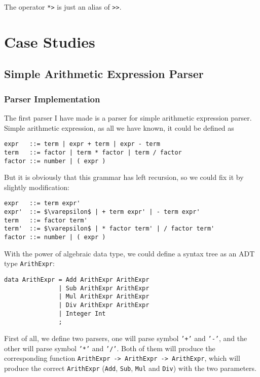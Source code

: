The operator \texttt{*>} is just an alias of \texttt{>>}.

\section{Case Studies}
\subsection{Simple Arithmetic Expression Parser}

\subsubsection{Parser Implementation}

The first parser I have made is a parser for simple arithmetic expression parser. Simple arithmetic expression, as all we have known, it could be defined as

\begin{lstlisting}[language={}]
expr   ::= term | expr + term | expr - term
term   ::= factor | term * factor | term / factor
factor ::= number | ( expr )
\end{lstlisting}

But it is obviously that this grammar has left recursion, so we could fix it by slightly modification:

\begin{lstlisting}[language={},mathescape]
expr   ::= term expr'
expr'  ::= $\varepsilon$ | + term expr' | - term expr'
term   ::= factor term'
term'  ::= $\varepsilon$ | * factor term' | / factor term'
factor ::= number | ( expr )
\end{lstlisting}

With the power of algebraic data type, we could define a syntax tree as an ADT type \texttt{ArithExpr}:

\begin{lstlisting}
data ArithExpr = Add ArithExpr ArithExpr
               | Sub ArithExpr ArithExpr
               | Mul ArithExpr ArithExpr
               | Div ArithExpr ArithExpr
               | Integer Int
               ;
\end{lstlisting}

First of all, we define two parsers, one will parse symbol \texttt{'+'} and \texttt{'-'}, and the other will parse symbol \texttt{'*'} and \texttt{'/'}. Both of them will produce the corresponding function \texttt{ArithExpr -> ArithExpr -> ArithExpr}, which will produce the correct \texttt{ArithExpr} (\texttt{Add}, \texttt{Sub}, \texttt{Mul} and \texttt{Div}) with the two parameters.

